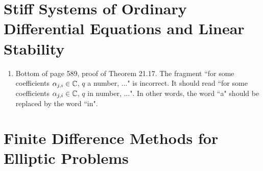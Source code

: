 \documentclass{book}
\begin{document}
	\chapter{Stiff Systems of Ordinary Differential Equations and Linear Stability}
	
	\begin{enumerate}
	\item 
Bottom of page 589, proof of Theorem 21.17. The fragment ``for some coefficients $\alpha_{j,i}\in\mathbb C$, $q$ a number, ..." is incorrect. It should read ``for some coefficients $\alpha_{j,i}\in\mathbb C$, $q$ in number, ...". In other words, the word ``a" should be replaced by the word ``in".
	\end{enumerate}
	
	\setcounter{chapter}{23}

\chapter{Finite Difference Methods for Elliptic Problems}
\end{document}
